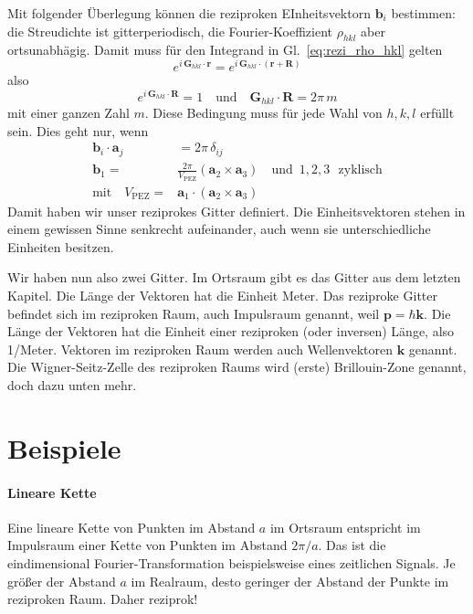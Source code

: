 Mit folgender Überlegung können die reziproken EInheitsvektorn $\mathbf{b}_i$ bestimmen: die Streudichte ist gitterperiodisch, die Fourier-Koeffizient $\rho_{hkl}$ aber ortsunabhägig. Damit muss für den Integrand in Gl.~\ref{eq:rezi_rho_hkl} gelten
\begin{equation}
 e^{i \, \mathbf{G}_{hkl} \cdot \mathbf{r}}  =  e^{i \, \mathbf{G}_{hkl} \cdot (\mathbf{r} + \mathbf{R})}
\end{equation}
also 
\begin{equation}
 e^{i \, \mathbf{G}_{hkl} \cdot  \mathbf{R}} = 1 \quad \text{und} \quad \mathbf{G}_{hkl} \cdot  \mathbf{R} = 2 \pi \, m
\end{equation}
mit einer ganzen Zahl $m$. Diese Bedingung muss für jede Wahl von $h,k,l$ erfüllt sein. Dies geht nur, wenn
\begin{align}
 \mathbf{b}_i \cdot \mathbf{a}_j & = 2 \pi \, \delta_{ij}  \\
  \mathbf{b}_1 = &\frac{2 \pi}{V_\text{PEZ}} \left(  \mathbf{a}_2 \times \mathbf{a}_3 \right)  \quad \text{und } \, 1,2,3 \, \,\text{ zyklisch} \\
  \text{mit} \quad  V_\text{PEZ} = &  \mathbf{a}_1 \cdot \left(  \mathbf{a}_2   \times \mathbf{a}_3 \right)
\end{align}
Damit haben wir unser reziprokes Gitter definiert. Die Einheitsvektoren stehen in einem gewissen Sinne senkrecht aufeinander, auch wenn  sie unterschiedliche Einheiten besitzen.


Wir haben nun also zwei Gitter. Im Ortsraum gibt es das Gitter aus dem letzten Kapitel. Die Länge der Vektoren hat die Einheit Meter. Das reziproke Gitter befindet sich im reziproken Raum, auch Impulsraum genannt, weil $\mathbf{p} = \hbar \mathbf{k}$. Die Länge der Vektoren hat die Einheit einer reziproken (oder inversen) Länge, also 1/Meter. Vektoren im reziproken Raum werden auch Wellenvektoren $\mathbf{k}$ genannt. Die Wigner-Seitz-Zelle des reziproken Raums wird (erste) Brillouin-Zone genannt, doch dazu unten mehr.


\section{Beispiele}

\paragraph{Lineare Kette} Eine lineare Kette von Punkten im Abstand $a$ im Ortsraum entspricht im Impulsraum einer Kette von Punkten im Abstand $2 \pi/a$. Das ist die eindimensional Fourier-Transformation beispielsweise eines zeitlichen Signals. Je größer der Abstand $a$ im Realraum, desto geringer der Abstand der Punkte im reziproken Raum. Daher reziprok!

